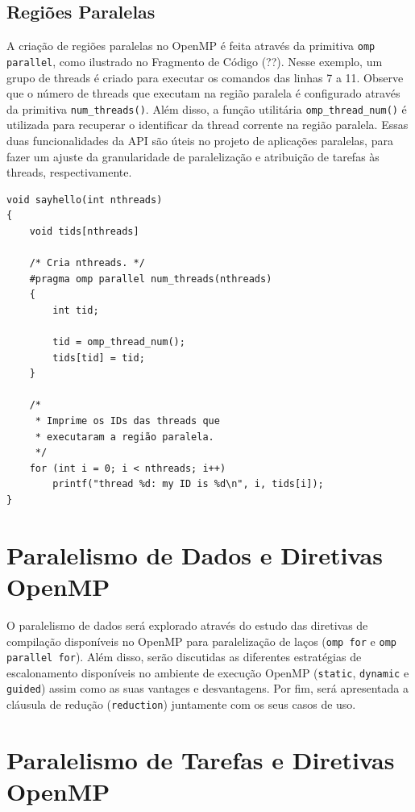 \documentclass{SBCbookchapter}
\begin{document}
	\subsection{Regiões Paralelas}

		A criação de regiões paralelas no OpenMP é feita através da
		primitiva \texttt{omp parallel}, como ilustrado no Fragmento de
		Código (??). Nesse exemplo, um grupo de threads é criado para
		executar os comandos das linhas 7 a 11. Observe que o número de
		threads que executam na região paralela é configurado através da
		primitiva \texttt{num\_threads()}. Além disso, a função utilitária
		\texttt{omp\_thread\_num()} é utilizada para recuperar o identificar
		da thread corrente na região paralela. Essas duas funcionalidades da
		API são úteis no projeto de aplicações paralelas, para  fazer um
		ajuste da granularidade de paralelização e atribuição de tarefas às
		threads, respectivamente.

\begin{lstlisting}[frame=single]
void sayhello(int nthreads)
{
	void tids[nthreads]

	/* Cria nthreads. */
	#pragma omp parallel num_threads(nthreads)
	{
		int tid;

		tid = omp_thread_num();
		tids[tid] = tid;
	}

	/* 
	 * Imprime os IDs das threads que
	 * executaram a região paralela.
	 */
	for (int i = 0; i < nthreads; i++)
		printf("thread %d: my ID is %d\n", i, tids[i]);
}
\end{lstlisting}


\section{Paralelismo de Dados e Diretivas OpenMP}

	O paralelismo de dados será explorado através do estudo das diretivas de
	compilação disponíveis no OpenMP para paralelização de laços
	(\texttt{omp for} e \texttt{omp parallel for}). Além disso, serão
	discutidas as diferentes estratégias de escalonamento disponíveis no
	ambiente de execução OpenMP (\texttt{static}, \texttt{dynamic} e
	\texttt{guided}) assim como as suas vantages e desvantagens. Por fim,
	será apresentada a cláusula de redução (\texttt{reduction}) juntamente
	com os seus casos de uso.

\section{Paralelismo de Tarefas e Diretivas OpenMP}
\end{document}
